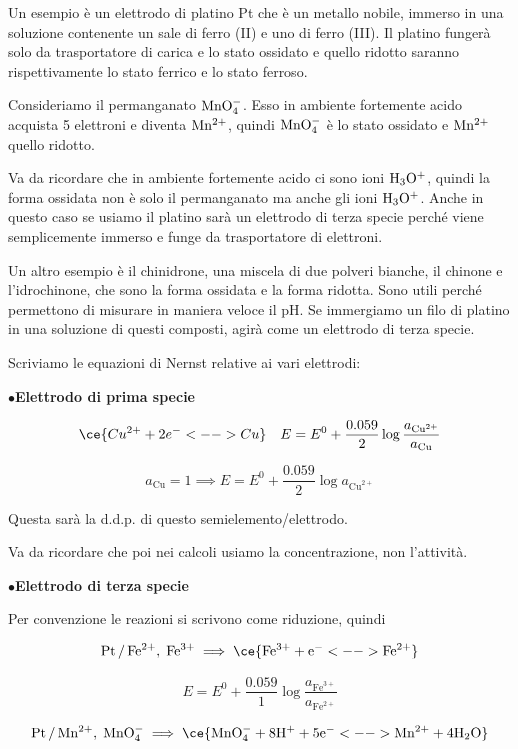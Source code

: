 Un esempio è un elettrodo di platino Pt che è un metallo nobile, immerso in una soluzione contenente un sale di ferro (II) e uno di ferro (III). Il platino fungerà solo da trasportatore di carica e lo stato ossidato e quello ridotto saranno rispettivamente lo stato ferrico e lo stato ferroso.

Consideriamo il permanganato $\rm MnO_4^-$. Esso in ambiente fortemente acido acquista 5 elettroni e diventa $\rm Mn^{2+}$, quindi $\rm MnO_4^-$ è lo stato ossidato e $\rm Mn^{2+}$ quello ridotto.

Va da ricordare che in ambiente fortemente acido ci sono ioni $\rm H_3O^+$, quindi la forma ossidata non è solo il permanganato ma anche gli ioni $\rm H_3O^+$. Anche in questo caso se usiamo il platino sarà un elettrodo di terza specie perché viene semplicemente immerso e funge da trasportatore di elettroni.

Un altro esempio è il chinidrone, una miscela di due polveri bianche, il chinone e l'idrochinone, che sono la forma ossidata e la forma ridotta. Sono utili perché permettono di misurare in maniera veloce il pH. Se immergiamo un filo di platino in una soluzione di questi composti, agirà come un elettrodo di terza specie.

\vspace{0.2cm}Scriviamo le equazioni di Nernst relative ai vari elettrodi:

\vspace{0.2cm} $\bullet$\textbf{Elettrodo di prima specie}

$$\ce{Cu^{2+} + 2e^- <--> Cu} \quad E= E^0 + \frac{0.059}{2}\log \frac{a_{\text{Cu}^{2+}}}{a_{\text{Cu}}}$$

$$a_{\text{Cu}}=1 \implies E= E^0 + \frac{0.059}{2}\log a_{\text{Cu}^{2+}}$$

Questa sarà la d.d.p. di questo semielemento/elettrodo.

Va da ricordare che poi nei calcoli usiamo la concentrazione, non l'attività.

\vspace{0.2cm} $\bullet$\textbf{Elettrodo di terza specie}

Per convenzione le reazioni si scrivono come riduzione, quindi

$$\rm Pt\,/\,Fe^{2+}, \; Fe^{3+} \implies \ce{Fe^{3+} + e^- <--> Fe^{2+}} $$

$$E = E^0 + \frac{0.059}{1} \log \frac{a_{\text{Fe}^{3+}}}{a_{\text{Fe}^{2+}}}$$

$$\rm Pt\,/\,Mn^{2+}, \; MnO_4^- \implies \ce{MnO_4^- + 8H^+ + 5e^- <--> Mn^{2+} + 4H_2O} $$


